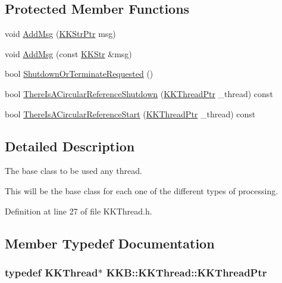 \subsection*{Protected Member Functions}
\begin{DoxyCompactItemize}
\item 
void \hyperlink{class_k_k_b_1_1_k_k_thread_a8f6c004d6510b90e5eff9c34efd20967}{Add\+Msg} (\hyperlink{namespace_k_k_b_a9adbef5a6b3be0867f5570df2a08f388}{K\+K\+Str\+Ptr} msg)
\item 
void \hyperlink{class_k_k_b_1_1_k_k_thread_a52304cd03534d86ce8e392d342d37a69}{Add\+Msg} (const \hyperlink{class_k_k_b_1_1_k_k_str}{K\+K\+Str} \&msg)
\item 
bool \hyperlink{class_k_k_b_1_1_k_k_thread_ac2f537ffb0162014816a7b446417bbd7}{Shutdown\+Or\+Terminate\+Requested} ()
\item 
bool \hyperlink{class_k_k_b_1_1_k_k_thread_ae767d026a9b2bfc4d4f50f1a24cf279f}{There\+Is\+A\+Circular\+Reference\+Shutdown} (\hyperlink{class_k_k_b_1_1_k_k_thread_ae0ca65f275a57c346e71486ad84b271a}{K\+K\+Thread\+Ptr} \+\_\+thread) const 
\item 
bool \hyperlink{class_k_k_b_1_1_k_k_thread_aead4ae8442a3f5c0f629ee0eed28a759}{There\+Is\+A\+Circular\+Reference\+Start} (\hyperlink{class_k_k_b_1_1_k_k_thread_ae0ca65f275a57c346e71486ad84b271a}{K\+K\+Thread\+Ptr} \+\_\+thread) const 
\end{DoxyCompactItemize}


\subsection{Detailed Description}
The base class to be used any thread. 

This will be the base class for each one of the different types of processing. 

Definition at line 27 of file K\+K\+Thread.\+h.



\subsection{Member Typedef Documentation}
\subsubsection[{\texorpdfstring{K\+K\+Thread\+Ptr}{KKThreadPtr}}]{\setlength{\rightskip}{0pt plus 5cm}typedef {\bf K\+K\+Thread}$\ast$ {\bf K\+K\+B\+::\+K\+K\+Thread\+::\+K\+K\+Thread\+Ptr}}\hypertarget{class_k_k_b_1_1_k_k_thread_ae0ca65f275a57c346e71486ad84b271a}{}\label{class_k_k_b_1_1_k_k_thread_ae0ca65f275a57c346e71486ad84b271a}


